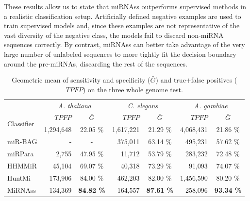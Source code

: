 \documentclass{article}
\begin{document}
These results allow us to state that miRNAss outperforms supervised methods in a realistic classification setup.
Artificially defined negative examples are used to train supervised models and, since these examples are not representative of the vast diversity of the negative class, the models fail to discard non-miRNA sequences correctly. By contrast, miRNAss can better take advantage of the very large number of unlabeled sequences to more tightly fit the decision boundary around the pre-miRNAs, discarding the rest of the sequences.
\begin{table}[tpb]
	\centering
	\caption{Geometric mean of sensitivity and specificity ($\bar{G}$) and true$+$false positives ($TPFP$) on the three whole genome test. \label{tab:wholegenome}}
	\begin{tabular}{@{}lrcrcrc@{}} \toprule
		&	\multicolumn{2}{c}{\textit{A. thaliana}}
		&	\multicolumn{2}{c}{\textit{C. elegans}}
		&	\multicolumn{2}{c}{\textit{A. gambiae}} \\
		\multirow{2}{*}{Classifier}	&	 $TPFP$		&	 $\bar{G}$
						&	 $TPFP$			&	 $\bar{G}$
						&	 $TPFP$			&	 $\bar{G}$	\\\midrule
		{\small Mirident}	&	 1,294,648		&	 22.05 \%
					&	 1,617,221		&	 21.29 \%
					&	 4,068,431		&	 21.86 \%	\\
		{\small miR-BAG}	&	 -			&	 -
					&	 375,011		&	 63.14 \%
					&	 495,231		&	 57.62 \%	\\
		{\small miRPara}	&	 2,755			&	 47.95 \%
					&	 11,712			&	 53.79 \%
					&	 283,232		&	 72.48 \%	\\
		{\small HHMMiR}		&	 45,104			&	 69.07 \%
					&	 40,318			&	 73.29 \%
					&	 91,093			&	 74.07 \%	\\
		{\small HuntMi}		&	 173,906		&	 84.00 \%
					&	 462,203		&	 82.00 \%
					&	 1,456,590		&	 80.20 \%	\\
		{\small MiRNAss}	&	 134,369		&	 \textbf{84.82 \%}
					&	 164,557		&	 \textbf{87.61 \%}
					&	 258,096		&	 \textbf{93.34 \%}	\\\bottomrule
	\end{tabular}
\end{table}
\end{document}
